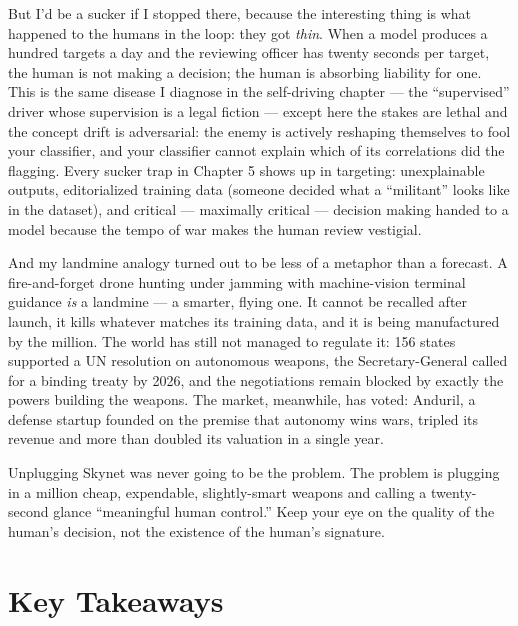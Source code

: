 But I'd be a sucker if I stopped there, because the interesting thing is what happened to the humans in the loop: they got \textit{thin}. When a model produces a hundred targets a day and the reviewing officer has twenty seconds per target, the human is not making a decision; the human is absorbing liability for one. This is the same disease I diagnose in the self-driving chapter --- the ``supervised'' driver whose supervision is a legal fiction --- except here the stakes are lethal and the concept drift is adversarial: the enemy is actively reshaping themselves to fool your classifier, and your classifier cannot explain which of its correlations did the flagging. Every sucker trap in Chapter 5 shows up in targeting: unexplainable outputs, editorialized training data (someone decided what a ``militant'' looks like in the dataset), and critical --- maximally critical --- decision making handed to a model because the tempo of war makes the human review vestigial.

And my landmine analogy turned out to be less of a metaphor than a forecast. A fire-and-forget drone hunting under jamming with machine-vision terminal guidance \textit{is} a landmine --- a smarter, flying one. It cannot be recalled after launch, it kills whatever matches its training data, and it is being manufactured by the million. The world has still not managed to regulate it: 156 states supported a UN resolution on autonomous weapons, the Secretary-General called for a binding treaty by 2026, and the negotiations remain blocked by exactly the powers building the weapons. The market, meanwhile, has voted: Anduril, a defense startup founded on the premise that autonomy wins wars, tripled its revenue and more than doubled its valuation in a single year.

Unplugging Skynet was never going to be the problem. The problem is plugging in a million cheap, expendable, slightly-smart weapons and calling a twenty-second glance ``meaningful human control.'' Keep your eye on the quality of the human's decision, not the existence of the human's signature.

\section{Key Takeaways}

